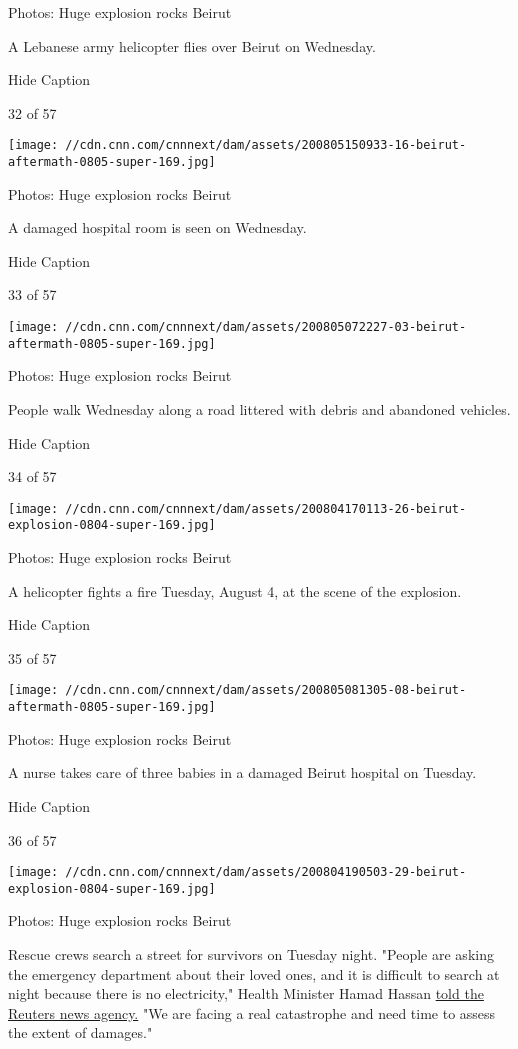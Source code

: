 Photos: Huge explosion rocks Beirut

A Lebanese army helicopter flies over Beirut on Wednesday.

Hide Caption

32 of 57

\texttt{[image: //cdn.cnn.com/cnnnext/dam/assets/200805150933-16-beirut-aftermath-0805-super-169.jpg]}

Photos: Huge explosion rocks Beirut

A damaged hospital room is seen on Wednesday.

Hide Caption

33 of 57

\texttt{[image: //cdn.cnn.com/cnnnext/dam/assets/200805072227-03-beirut-aftermath-0805-super-169.jpg]}

Photos: Huge explosion rocks Beirut

People walk Wednesday along a road littered with debris and abandoned
vehicles.

Hide Caption

34 of 57

\texttt{[image: //cdn.cnn.com/cnnnext/dam/assets/200804170113-26-beirut-explosion-0804-super-169.jpg]}

Photos: Huge explosion rocks Beirut

A helicopter fights a fire Tuesday, August 4, at the scene of the
explosion.

Hide Caption

35 of 57

\texttt{[image: //cdn.cnn.com/cnnnext/dam/assets/200805081305-08-beirut-aftermath-0805-super-169.jpg]}

Photos: Huge explosion rocks Beirut

A nurse takes care of three babies in a damaged Beirut hospital on
Tuesday.

Hide Caption

36 of 57

\texttt{[image: //cdn.cnn.com/cnnnext/dam/assets/200804190503-29-beirut-explosion-0804-super-169.jpg]}

Photos: Huge explosion rocks Beirut

Rescue crews search a street for survivors on Tuesday night. "People are
asking the emergency department about their loved ones, and it is
difficult to search at night because there is no electricity," Health
Minister Hamad Hassan
\href{https://www.cnn.com/middleeast/live-news/lebanon-beirut-explosion-live-updates-dle-intl/h_191ad60f239ae9b49e4332022ce8db8c}{told
the Reuters news agency.} "We are facing a real catastrophe and need
time to assess the extent of damages."

